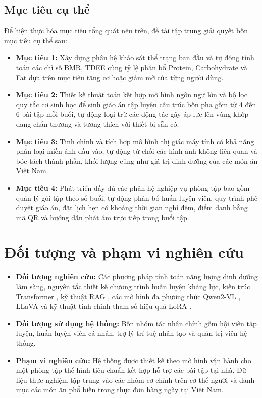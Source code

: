 \subsection{Mục tiêu cụ thể}
\label{subsec:muctieu_cuthe}

Để hiện thực hóa mục tiêu tổng quát nêu trên, đề tài tập trung giải quyết bốn mục tiêu cụ thể sau:
\begin{itemize}[leftmargin=1.5cm]
    \item \textbf{Mục tiêu 1:} Xây dựng phân hệ khảo sát thể trạng ban đầu và tự động tính toán các chỉ số BMR, TDEE cùng tỷ lệ phân bổ Protein, Carbohydrate và Fat dựa trên mục tiêu tăng cơ hoặc giảm mỡ của từng người dùng.
    \item \textbf{Mục tiêu 2:} Thiết kế thuật toán kết hợp mô hình ngôn ngữ lớn và bộ lọc quy tắc cơ sinh học để sinh giáo án tập luyện cấu trúc bốn pha gồm từ 4 đến 6 bài tập mỗi buổi, tự động loại trừ các động tác gây áp lực lên vùng khớp đang chấn thương và tương thích với thiết bị sẵn có.
    \item \textbf{Mục tiêu 3:} Tinh chỉnh và tích hợp mô hình thị giác máy tính có khả năng phân loại miền ảnh đầu vào, tự động từ chối các hình ảnh không liên quan và bóc tách thành phần, khối lượng cũng như giá trị dinh dưỡng của các món ăn Việt Nam.
    \item \textbf{Mục tiêu 4:} Phát triển đầy đủ các phân hệ nghiệp vụ phòng tập bao gồm quản lý gói tập theo số buổi, tự động phân bổ huấn luyện viên, quy trình phê duyệt giáo án, đặt lịch hẹn có khoảng thời gian nghỉ đệm, điểm danh bằng mã QR và hướng dẫn phát âm trực tiếp trong buổi tập.
\end{itemize}

\section{Đối tượng và phạm vi nghiên cứu}
\label{sec:phamvi}

\begin{itemize}[leftmargin=1.5cm]
    \item \textbf{Đối tượng nghiên cứu:} Các phương pháp tính toán năng lượng dinh dưỡng lâm sàng, nguyên tắc thiết kế chương trình huấn luyện kháng lực, kiến trúc Transformer \cite{vaswani2017attention}, kỹ thuật RAG \cite{lewis2020rag}, các mô hình đa phương thức Qwen2-VL \cite{wang2024qwen2vl}, LLaVA \cite{liu2023llava} và kỹ thuật tinh chỉnh tham số hiệu quả LoRA \cite{hu2022lora}.
    \item \textbf{Đối tượng sử dụng hệ thống:} Bốn nhóm tác nhân chính gồm hội viên tập luyện, huấn luyện viên cá nhân, trợ lý trí tuệ nhân tạo và quản trị viên hệ thống.
    \item \textbf{Phạm vi nghiên cứu:} Hệ thống được thiết kế theo mô hình vận hành cho một phòng tập thể hình tiêu chuẩn kết hợp hỗ trợ các bài tập tại nhà. Dữ liệu thực nghiệm tập trung vào các nhóm cơ chính trên cơ thể người và danh mục các món ăn phổ biến trong thực đơn hàng ngày tại Việt Nam.
\end{itemize}

